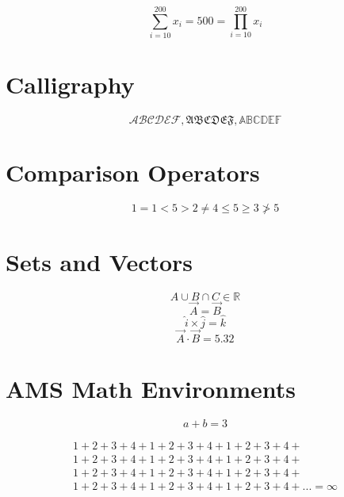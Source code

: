 \documentclass[a4paper, 12pt]{article}
\begin{document}
\begin{equation}
    \sum_{i = 10}^{200} x_i = 500 = \prod_{i = 10}^{200} x_i
\end{equation}

\section{Calligraphy}
\begin{equation}
    \mathcal{ABCDEF}, \mathfrak{ABCDEF}, \mathbb{ABCDEF}
\end{equation}

\section{Comparison Operators}
\begin{equation}
    1 = 1 < 5 > 2 \neq 4 \leq 5 \geq 3 \ngtr 5
\end{equation}

\section{Sets and Vectors}
\begin{equation}
    A \cup B \cap C \in \mathbb{R}
\end{equation}
\begin{equation}
    \Vec{A} = \Vec{B}
\end{equation}
\begin{equation}
    \hat{i} \times \hat{j} = \hat{k}
\end{equation}
\begin{equation}
    \Vec{A} \cdot \Vec{B} = 5.32 
\end{equation}

\section{AMS Math Environments}
\begin{equation*}
    a + b = 3
\end{equation*}

\begin{multline}
    1 + 2 + 3 + 4 + 1 + 2 + 3 + 4 + 1 + 2 + 3 + 4 + \\
    1 + 2 + 3 + 4 + 1 + 2 + 3 + 4 + 1 + 2 + 3 + 4 + \\
    1 + 2 + 3 + 4 + 1 + 2 + 3 + 4 + 1 + 2 + 3 + 4 + \\
    1 + 2 + 3 + 4 + 1 + 2 + 3 + 4 + 1 + 2 + 3 + 4 + ... = \infty
\end{multline}
\end{document}
